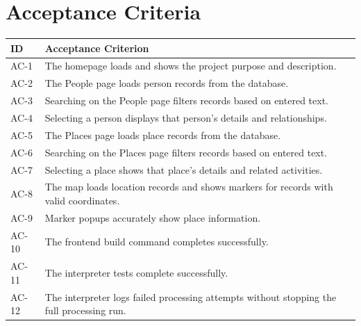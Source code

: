 \section{Acceptance Criteria}

\begin{longtable}{|p{}|p{}|}
	\hline
	\textbf{ID} & \textbf{Acceptance Criterion}                                                             \\
	\hline
	AC-1        & The homepage loads and shows the project purpose and description.                         \\
	\hline
	AC-2        & The People page loads person records from the database.                                   \\
	\hline
	AC-3        & Searching on the People page filters records based on entered text.                       \\
	\hline
	AC-4        & Selecting a person displays that person's details and relationships.                      \\
	\hline
	AC-5        & The Places page loads place records from the database.                                    \\
	\hline
	AC-6        & Searching on the Places page filters records based on entered text.                       \\
	\hline
	AC-7        & Selecting a place shows that place's details and related activities.                      \\
	\hline
	AC-8        & The map loads location records and shows markers for records with valid coordinates.      \\
	\hline
	AC-9        & Marker popups accurately show place information.                                          \\
	\hline
	AC-10       & The frontend build command completes successfully.                                        \\
	\hline
	AC-11       & The interpreter tests complete successfully.                                              \\
	\hline
	AC-12       & The interpreter logs failed processing attempts without stopping the full processing run. \\
	\hline
\end{longtable}
